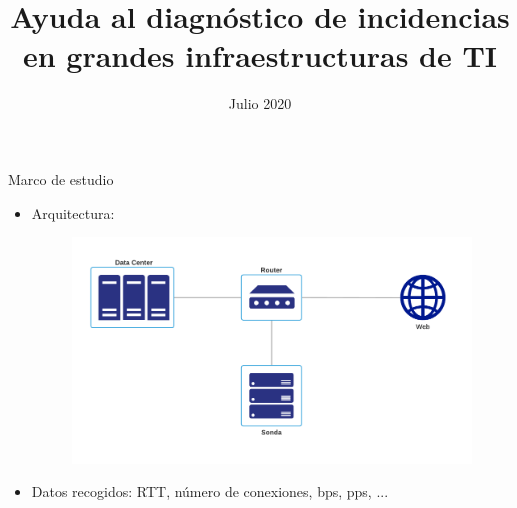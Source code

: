 \documentclass{beamer}
\title[Diagnóstico automatizado de incidencias]{Ayuda al diagnóstico de incidencias en grandes infraestructuras de TI}
\author[Rodrigo De Pool]{}
\date[]{Julio 2020}
\begin{document}
\frame{\titlepage}
 

\begin{frame}
\begin{block}{Marco de estudio}
\begin{itemize}
    \item Arquitectura:
    		\begin{figure}[htb]
		\begin{center}
		\includegraphics[scale=0.5]{imagenes/arq.pdf} 
		\end{center}
		\end{figure}	
    \item Datos recogidos: RTT, número de conexiones, bps, pps, ...
\end{itemize}
\end{block}
\end{frame}
\end{document}
